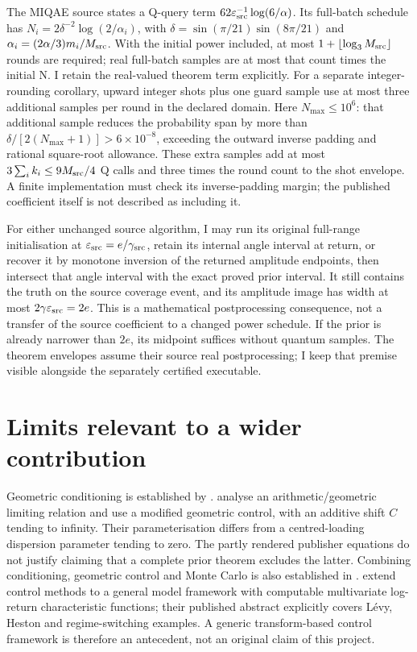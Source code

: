 The MIQAE source states a Q-query term \(62\varepsilon_{\rm src}^{-1}\log(6/\alpha)\). Its full-batch schedule has \(N_i=2\delta^{-2}\log(2/\alpha_i)\), with \(\delta=\sin(\pi/21)\sin(8\pi/21)\) and \(\alpha_i=(2\alpha/3)m_i/M_{\rm src}\). With the initial power included, at most \(1+\lfloor\log_3 M_{\rm src}\rfloor\) rounds are required; real full-batch samples are at most that count times the initial N. I retain the real-valued theorem term explicitly. For a separate integer-rounding corollary, upward integer shots plus one guard sample use at most three additional samples per round in the declared domain. Here \(N_{\max}\leq10^6\): that additional sample reduces the probability span by more than \(\delta/[2(N_{\max}+1)]>6\times10^{-8}\), exceeding the outward inverse padding and rational square-root allowance. These extra samples add at most \(3\sum_i k_i\leq9M_{\rm src}/4\) Q calls and three times the round count to the shot envelope. A finite implementation must check its inverse-padding margin; the published coefficient itself is not described as including it.

For either unchanged source algorithm, I may run its original full-range initialisation at \(\varepsilon_{\rm src}=e/\gamma_{\rm src}\), retain its internal angle interval at return, or recover it by monotone inversion of the returned amplitude endpoints, then intersect that angle interval with the exact proved prior interval. It still contains the truth on the source coverage event, and its amplitude image has width at most \(2\gamma \varepsilon_{\rm src}=2e\). This is a mathematical postprocessing consequence, not a transfer of the source coefficient to a changed power schedule. If the prior is already narrower than \(2e\), its midpoint suffices without quantum samples. The theorem envelopes assume their source real postprocessing; I keep that premise visible alongside the separately certified executable.

\section{Limits relevant to a wider contribution}
\label{sec:miqae-interpretation}

Geometric conditioning is established by \citet{curran}. \citet{kornzeytun} analyse an arithmetic/geometric limiting relation and use a modified geometric control, with an additive shift \(C\) tending to infinity. Their parameterisation differs from a centred-loading dispersion parameter tending to zero. The partly rendered publisher equations do not justify claiming that a complete prior theorem excludes the latter. Combining conditioning, geometric control and Monte Carlo is also established in \citet{dingechormann}. \citet{dingecsakhormann} extend control methods to a general model framework with computable multivariate log-return characteristic functions; their published abstract explicitly covers Lévy, Heston and regime-switching examples. A generic transform-based control framework is therefore an antecedent, not an original claim of this project.

